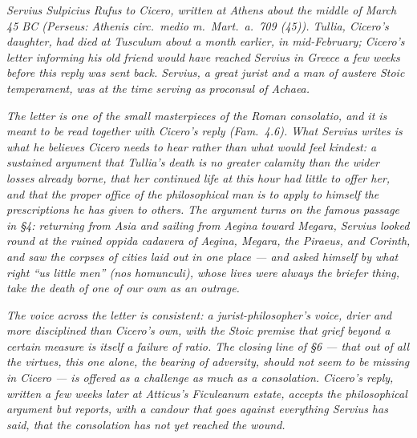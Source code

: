 
\textit{Servius Sulpicius Rufus to Cicero, written at Athens
about the middle of March 45 BC (Perseus: \textit{Athenis
circ.~medio m.~Mart.~a.~709 (45)}). Tullia, Cicero's daughter,
had died at Tusculum about a month earlier, in mid-February;
Cicero's letter informing his old friend would have reached
Servius in Greece a few weeks before this reply was sent back.
Servius, a great jurist and a man of austere Stoic temperament,
was at the time serving as proconsul of Achaea.}

\textit{The letter is one of the small masterpieces of the Roman
\textit{consolatio}, and it is meant to be read together with
Cicero's reply (\textit{Fam.}~4.6). What Servius writes is what
he believes Cicero needs to hear rather than what would feel
kindest: a sustained argument that Tullia's death is no greater
calamity than the wider losses already borne, that her continued
life at this hour had little to offer her, and that the proper
office of the philosophical man is to apply to himself the
prescriptions he has given to others. The argument turns on the
famous passage in \S 4: returning from Asia and sailing from
Aegina toward Megara, Servius looked round at the ruined
\textit{oppida cadavera} of Aegina, Megara, the Piraeus, and
Corinth, and saw the corpses of cities laid out in one place ---
and asked himself by what right ``us little men''
(\textit{nos homunculi}), whose lives were always the briefer
thing, take the death of one of our own as an outrage.}

\textit{The voice across the letter is consistent: a
jurist-philosopher's voice, drier and more disciplined than
Cicero's own, with the Stoic premise that grief beyond a certain
measure is itself a failure of \textit{ratio}. The closing line
of \S 6 --- that out of all the virtues, this one alone, the
bearing of adversity, should not seem to be missing in Cicero ---
is offered as a challenge as much as a consolation. Cicero's
reply, written a few weeks later at Atticus's Ficuleanum estate,
accepts the philosophical argument but reports, with a candour
that goes against everything Servius has said, that the
consolation has not yet reached the wound.}
